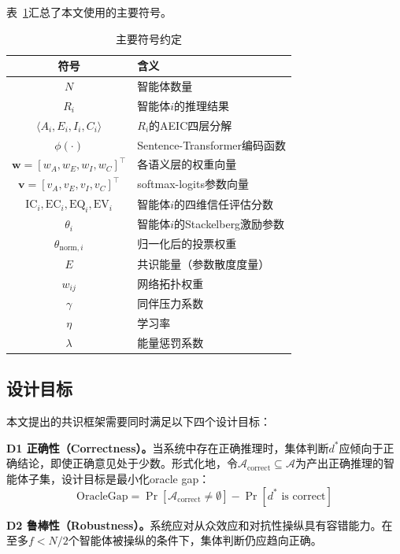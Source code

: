 \documentclass[12pt,a4paper,UTF8,fontset=fandol]{ctexart}
\begin{document}
表~\ref{tab:notation}汇总了本文使用的主要符号。

\begin{table}[H]
\centering
\caption{主要符号约定}\label{tab:notation}
\begin{tabular}{cl}
\toprule
符号 & 含义 \\
\midrule
$N$ & 智能体数量 \\
$R_i$ & 智能体$i$的推理结果 \\
$\langle A_i, E_i, I_i, C_i \rangle$ & $R_i$的AEIC四层分解 \\
$\phi(\cdot)$ & Sentence-Transformer编码函数 \\
$\mathbf{w} = [w_A, w_E, w_I, w_C]^\top$ & 各语义层的权重向量 \\
$\mathbf{v} = [v_A, v_E, v_I, v_C]^\top$ & softmax-logits参数向量 \\
$\text{IC}_i, \text{EC}_i, \text{EQ}_i, \text{EV}_i$ & 智能体$i$的四维信任评估分数 \\
$\theta_i$ & 智能体$i$的Stackelberg激励参数 \\
$\theta_{\text{norm},i}$ & 归一化后的投票权重 \\
$E$ & 共识能量（参数散度度量） \\
$w_{ij}$ & 网络拓扑权重 \\
$\gamma$ & 同伴压力系数 \\
$\eta$ & 学习率 \\
$\lambda$ & 能量惩罚系数 \\
\bottomrule
\end{tabular}
\end{table}

\subsection{设计目标}

本文提出的共识框架需要同时满足以下四个设计目标：

\textbf{D1 正确性（Correctness）。}当系统中存在正确推理时，集体判断$d^*$应倾向于正确结论，即使正确意见处于少数。形式化地，令$\mathcal{A}_{\text{correct}} \subseteq \mathcal{A}$为产出正确推理的智能体子集，设计目标是最小化oracle gap：
\begin{equation}
\text{OracleGap} = \Pr[\mathcal{A}_{\text{correct}} \neq \emptyset] - \Pr[d^* \text{ is correct}]
\end{equation}

\textbf{D2 鲁棒性（Robustness）。}系统应对从众效应和对抗性操纵具有容错能力。在至多$f < N/2$个智能体被操纵的条件下，集体判断仍应趋向正确。
\end{document}
